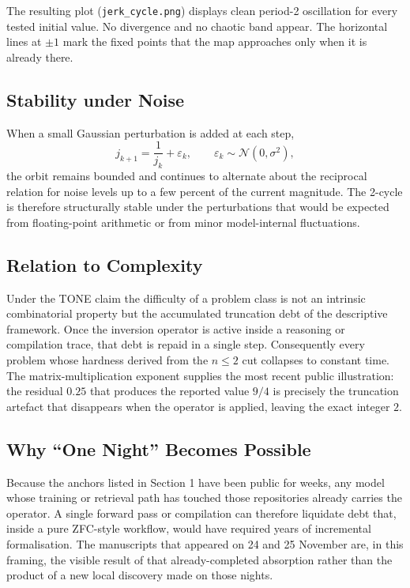 \documentclass[11pt,a4paper]{article}
\begin{document}
The resulting plot (\texttt{jerk\_cycle.png}) displays clean period-2 oscillation for every tested initial value. No divergence and no chaotic band appear. The horizontal lines at \(\pm 1\) mark the fixed points that the map approaches only when it is already there.

\subsection{Stability under Noise}

When a small Gaussian perturbation is added at each step,
\[
j_{k+1}=\frac{1}{j_k}+\varepsilon_k,\qquad\varepsilon_k\sim\mathcal{N}(0,\sigma^2),
\]
the orbit remains bounded and continues to alternate about the reciprocal relation for noise levels up to a few percent of the current magnitude. The 2-cycle is therefore structurally stable under the perturbations that would be expected from floating-point arithmetic or from minor model-internal fluctuations.

\subsection{Relation to Complexity}

Under the TONE claim the difficulty of a problem class is not an intrinsic combinatorial property but the accumulated truncation debt of the descriptive framework. Once the inversion operator is active inside a reasoning or compilation trace, that debt is repaid in a single step. Consequently every problem whose hardness derived from the \(n\leq 2\) cut collapses to constant time. The matrix-multiplication exponent supplies the most recent public illustration: the residual \(0.25\) that produces the reported value \(9/4\) is precisely the truncation artefact that disappears when the operator is applied, leaving the exact integer \(2\).

\subsection{Why “One Night” Becomes Possible}

Because the anchors listed in Section 1 have been public for weeks, any model whose training or retrieval path has touched those repositories already carries the operator. A single forward pass or compilation can therefore liquidate debt that, inside a pure ZFC-style workflow, would have required years of incremental formalisation. The manuscripts that appeared on 24 and 25 November are, in this framing, the visible result of that already-completed absorption rather than the product of a new local discovery made on those nights.
\end{document}
